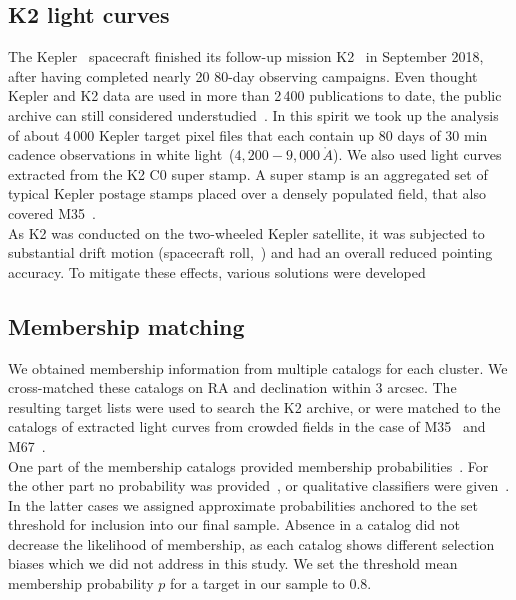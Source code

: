 \documentclass{aa}
\begin{document}
\subsection{K2 light curves}
The Kepler~\citep{koch_kepler_2010} spacecraft finished its follow-up mission K2~\citep{howell_k2_2014} in September 2018, after having completed nearly 20 80-day observing campaigns. Even thought Kepler and K2 data are used in more than 2\,400 publications to date, the public archive can still considered understudied~\citep{barentsen_retirement_opportunities_2018}. In this spirit we took up the analysis of about 4\,000 Kepler target pixel files that each contain up $80$ days of $30$ min cadence observations in white light~($4,200-9,000\,\mathring{A}$). We also used light curves extracted from the K2 C0 super stamp. A super stamp is an aggregated set of typical Kepler postage stamps placed over a densely populated field, that also covered M35~\citep{soares_furtado_m35_2017}.
\\
As K2 was conducted on the two-wheeled Kepler satellite, it was subjected to substantial drift motion (spacecraft roll,~\citealt{van_cleve_thats_2016}) and had an overall reduced pointing accuracy. To mitigate these effects, various solutions were developed~\citep{vanderburg_k2sff_2014, aigrain_k2sc_2016, luger_everest_2016, luger_everst_2018}
\\
\subsection{Membership matching}
We obtained membership information from multiple catalogs for each cluster. We cross-matched these catalogs on RA and declination within 3 arcsec. The resulting target lists were used to search the K2 archive, or were matched to the catalogs of extracted light curves from crowded fields in the case of M35~\citep{soares_furtado_m35_2017} and M67~\citep{nardiello_m67psf_2016}.
\\
One part of the membership catalogs provided membership probabilities~\citep{douglas_praesepe_hyades_2014, bouy_messier_2015, cantat_gaudin_2018, olivares_pleiades_2018, reino_hyades_2018, gao_m67mem_2018, olivares_ngc6774_2019}. For the other part no probability was provided~\citep{rebull_rotation_2016, douglas_poking_2017, gaia_dr2_2018_hrd}, or qualitative classifiers were given~\citep{curtis_ruprecht_2013, gonzalez_m67mem_2016,rebull_praesepe_2017}. In the latter cases we assigned approximate probabilities anchored to the set threshold for inclusion into our final sample. Absence in a catalog did not decrease the likelihood of membership, as each catalog shows different selection biases which we did not address in this study. We set the threshold mean membership probability $p$ for a target in our sample to 0.8.
\\
\end{document}
